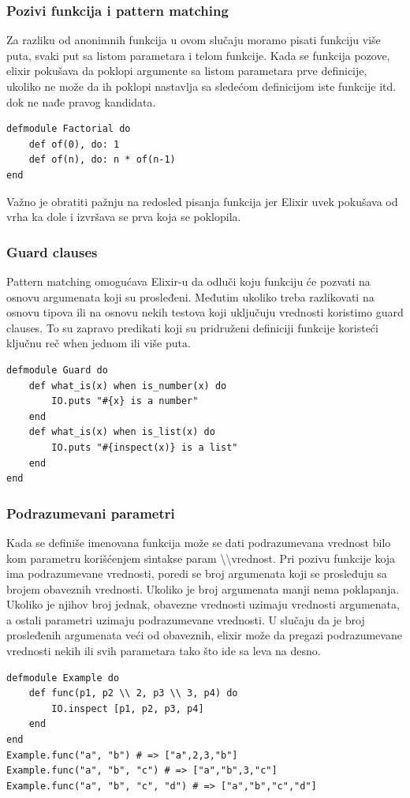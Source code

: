\documentclass[a4paper]{article}
\begin{document}
\subsubsection{Pozivi funkcija i pattern matching}
Za razliku od anonimnih funkcija u ovom slučaju moramo pisati funkciju više puta, svaki put sa listom parametara i telom funkcije. Kada se funkcija pozove, elixir pokušava da poklopi argumente sa listom parametara prve definicije, ukoliko ne može da ih poklopi nastavlja sa sledećom definicijom iste funkcije itd. dok ne nađe pravog kandidata.
\begin{verbatim}
defmodule Factorial do
    def of(0), do: 1
    def of(n), do: n * of(n-1)
end
\end{verbatim}

Važno je obratiti pažnju na redosled pisanja funkcija jer Elixir uvek pokušava od vrha ka dole i izvršava se prva koja se poklopila.

\subsubsection{Guard clauses}
Pattern matching omogućava Elixir-u da odluči koju funkciju će pozvati na osnovu argumenata koji su prosleđeni. Međutim ukoliko treba razlikovati na osnovu tipova ili na osnovu nekih testova koji uključuju vrednosti koristimo guard clauses. To su zapravo predikati koji su pridruženi definiciji funkcije koristeći ključnu reč when jednom ili više puta. 
\begin{verbatim}
defmodule Guard do
    def what_is(x) when is_number(x) do
        IO.puts "#{x} is a number"
    end
    def what_is(x) when is_list(x) do
        IO.puts "#{inspect(x)} is a list"
    end
end
\end{verbatim}

\subsubsection{Podrazumevani parametri}
Kada se definiše imenovana funkcija  može se dati podrazumevana vrednost bilo kom parametru korišćenjem sintakse  param \textbackslash \textbackslash  vrednost. Pri pozivu funkcije koja ima podrazumevane vrednosti, poredi se broj argumenata koji se prosleđuju sa brojem obaveznih vrednosti. Ukoliko je broj argumenata manji  nema poklapanja. Ukoliko je njihov broj jednak, obavezne vrednosti uzimaju vrednosti argumenata, a ostali parametri uzimaju podrazumevane vrednosti. U slučaju da je broj prosleđenih argumenata veći od obaveznih, elixir može da pregazi podrazumevane vrednosti nekih ili svih parametara tako što ide sa leva na desno.
\begin{verbatim}
defmodule Example do
    def func(p1, p2 \\ 2, p3 \\ 3, p4) do
        IO.inspect [p1, p2, p3, p4]
    end
end
Example.func("a", "b") # => ["a",2,3,"b"]
Example.func("a", "b", "c") # => ["a","b",3,"c"]
Example.func("a", "b", "c", "d") # => ["a","b","c","d"]
\end{verbatim}
\end{document}
